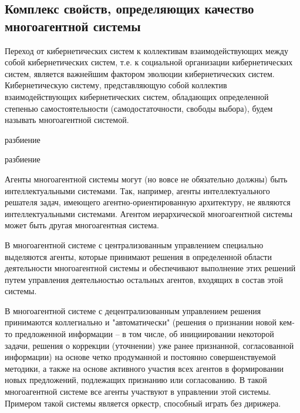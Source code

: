 \subsection{Комплекс свойств, определяющих качество многоагентной системы}

Переход от кибернетических систем к коллективам взаимодействующих между собой кибернетических систем, т.е. к социальной организации кибернетических систем, является важнейшим фактором эволюции кибернетических систем. 
Кибернетическую систему, представляющую собой коллектив взаимодействующих кибернетических систем, обладающих определенной степенью самостоятельности (самодостаточности, свободы выбора), будем называть многоагентной системой.

\begin{SCn}
\begin{scnrelfromset}{разбиение}
    \begin{scnindent}
    \begin{scnrelfromset}{разбиение}
    \end{scnrelfromset}
    \end{scnindent}
\end{scnrelfromset}
\end{SCn}

Агенты многоагентной системы могут (но вовсе не обязательно должны) быть интеллектуальными системами. 
Так, например, агенты интеллектуального решателя задач, имеющего агентно-ориентированную архитектуру, не являются интеллектуальными системами. 
Агентом иерархической многоагентной системы может быть другая многоагентная система.

В многоагентной системе с централизованным управлением специально выделяются агенты, которые принимают решения в определенной области деятельности многоагентной системы и обеспечивают выполнение этих решений путем управления деятельностью остальных агентов, входящих в состав этой системы.

В многоагентной системе с децентрализованным управлением решения принимаются коллегиально и "автоматически"{} (решения о признании новой кем-то предложенной информации – в том числе, об инициировании некоторой задачи, решения о коррекции (уточнении) уже ранее признанной, согласованной информации) на основе четко продуманной и постоянно совершенствуемой методики, а также на основе активного участия всех агентов в формировании новых предложений, подлежащих признанию или согласованию. 
В такой многоагентной системе все агенты участвуют в управлении этой системы. 
Примером такой системы является оркестр, способный играть без дирижера.

